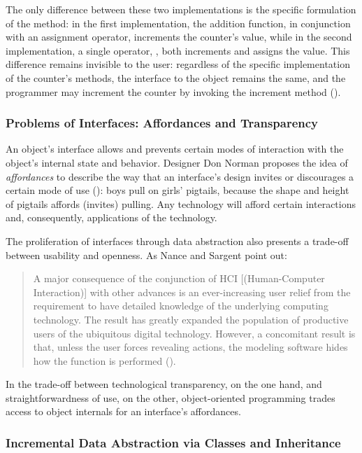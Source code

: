 \noindent The only difference between these two  implementations is the specific formulation of the  method: in the first implementation, the addition function, in conjunction with an assignment operator, increments the counter's value, while in the second implementation, a single operator, \code{+=}, both increments and assigns the value. This difference remains invisible to the user: regardless of the specific implementation of the counter's methods, the interface to the object remains the same, and the programmer may increment the counter by invoking the increment method ().

\subsubsection{Problems of Interfaces: Affordances and Transparency}
An object's interface allows and prevents certain modes of interaction with the object's internal state and behavior. Designer Don Norman proposes the idea of \emph{affordances} to describe the way that an interface's design invites or discourages a certain mode of use (\cite{Norman:2003mz}): boys pull on girls' pigtails, because the shape and height of pigtails affords (invites) pulling. Any technology will afford certain interactions and, consequently, applications of the technology. 

The proliferation of interfaces through data abstraction also presents a trade-off between usability and openness. As Nance and Sargent point out:

\begin{quote}A major consequence of the conjunction of HCI [(Human-Computer Interaction)] with other advances is an ever-increasing user relief from the requirement to have detailed knowledge of the underlying computing technology. The result has greatly expanded the population of productive users of the ubiquitous digital technology. However, a concomitant result is that, unless the user forces revealing actions, the modeling software hides how the function is performed (\cite[164]{nance2002perspectives}).
\end{quote}

\noindent In the trade-off between technological transparency, on the one hand, and straightforwardness of use, on the other, object-oriented programming trades access to object internals for an interface's affordances. 

\subsubsection{Incremental Data Abstraction via Classes and Inheritance}

